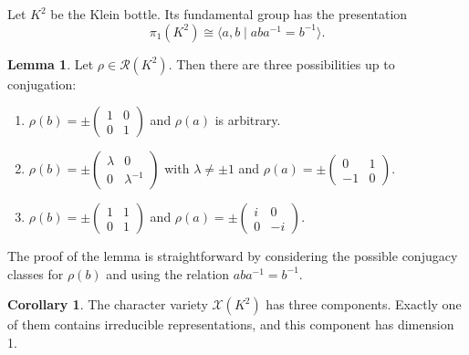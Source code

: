 \documentclass[12pt,reqno]{amsart}
\theoremstyle{definition}
\newtheorem{lemma}[theorem]{Lemma}
\newtheorem{corollary}[theorem]{Corollary}
\def\calR{\mathcal R}
\begin{document}
Let $K^2$ be the Klein bottle. Its fundamental group has the presentation
\begin{equation}
    \label{eqn.klein}
    \pi_1(K^2)\cong\langle a, b\mid ab a^{-1}= b^{-1}\rangle.
\end{equation}
\begin{lemma}
    \label{Lemma:repsK2}
    Let $\rho \in \calR(K^2)$. Then there are three possibilities up to conjugation:
    \begin{enumerate}
        \item $\rho(b)=\pm \left(\begin{smallmatrix}
            1 & 0 \\ 0 & 1
        \end{smallmatrix}\right)$ and $\rho(a)$ is arbitrary.
        \item $\rho(b)=
            \pm \left(\begin{smallmatrix}
                \lambda & 0 \\ 0 & \lambda^{-1}
            \end{smallmatrix}\right)$ with $\lambda\neq \pm 1$ and 
        $\rho(a)=
        \pm \left(\begin{smallmatrix}
                0 & 1 \\ -1 & 0
            \end{smallmatrix}\right)$.
        \item $\rho(b)=
            \pm \left(\begin{smallmatrix}
                1 & 1 \\ 0 & 1
            \end{smallmatrix}\right)$
            and 
            $\rho(a)=
            \pm \left(\begin{smallmatrix}
            i & 0 \\ 0 & -i
        \end{smallmatrix}\right)$.
    \end{enumerate}
\end{lemma}
The proof of the lemma is straightforward by considering the possible conjugacy classes 
for $\rho(b)$ and using the relation $aba^{-1}=b^{-1}$.



\begin{corollary}
    The character variety $\mathcal X( K^2)$ has three components. Exactly
    one of them contains irreducible representations, and this component has dimension 1. 
\end{corollary}
\end{document}

